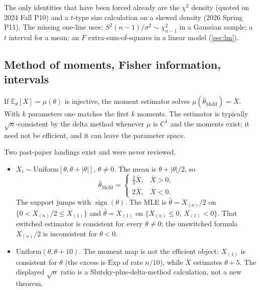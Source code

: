 The only identities that have been forced already are the \(\chi^{2}\) density (quoted on 2024 Fall P10) and a \(t\)-type size calculation on a skewed density (2026 Spring P11). The missing one-line uses: \(S^{2}(n-1)/\sigma^{2}\sim\chi^{2}_{n-1}\) in a Gaussian sample; a \(t\) interval for a mean; an \(F\) extra-sum-of-squares in a linear model (\cref{sec:lm}).

\subsection{Method of moments, Fisher information, intervals}

\begin{definition}
\label{def:mom}
If \(\mathbb{E}_{\theta}[X]=\mu(\theta)\) is injective, the moment estimator solves \(\mu(\hat\theta_{\mathrm{MoM}})=\bar X\). With \(k\) parameters one matches the first \(k\) moments. The estimator is typically \(\sqrt{n}\)-consistent by the delta method whenever \(\mu\) is \(C^{1}\) and the moments exist; it need not be efficient, and it can leave the parameter space.
\end{definition}

Two past-paper landings exist and were never reviewed.

\begin{itemize}
    \item {} \(X_{i}\sim\mathrm{Uniform}[\theta,\theta+\lvert\theta\rvert]\), \(\theta\neq 0\). The mean is \(\theta+\lvert\theta\rvert/2\), so
    \[
    \hat\theta_{\mathrm{MoM}}
    =
    \begin{cases}
    \tfrac23\bar X, & \bar X>0,\\
    2\bar X, & \bar X<0.
    \end{cases}
    \]
    The support jumps with \(\operatorname{sign}(\theta)\). The MLE is \(\hat\theta=X_{(n)}/2\) on \(\{0<X_{(n)}/2\le X_{(1)}\}\) and \(\hat\theta=X_{(1)}\) on \(\{X_{(n)}\le 0,\,X_{(1)}<0\}\). That switched estimator is consistent for every \(\theta\neq 0\); the unswitched formula \(X_{(n)}/2\) is inconsistent for \(\theta<0\).
    \item {} \(\mathrm{Uniform}(\theta,\theta+10)\). The moment map is not the efficient object: \(X_{(1)}\) is consistent for \(\theta\) (the excess is \(\mathrm{Exp}\) of rate \(n/10\)), while \(\bar X\) estimates \(\theta+5\). The displayed \(\sqrt{n}\) ratio is a Slutsky-plus-delta-method calculation, not a new theorem.
\end{itemize}

